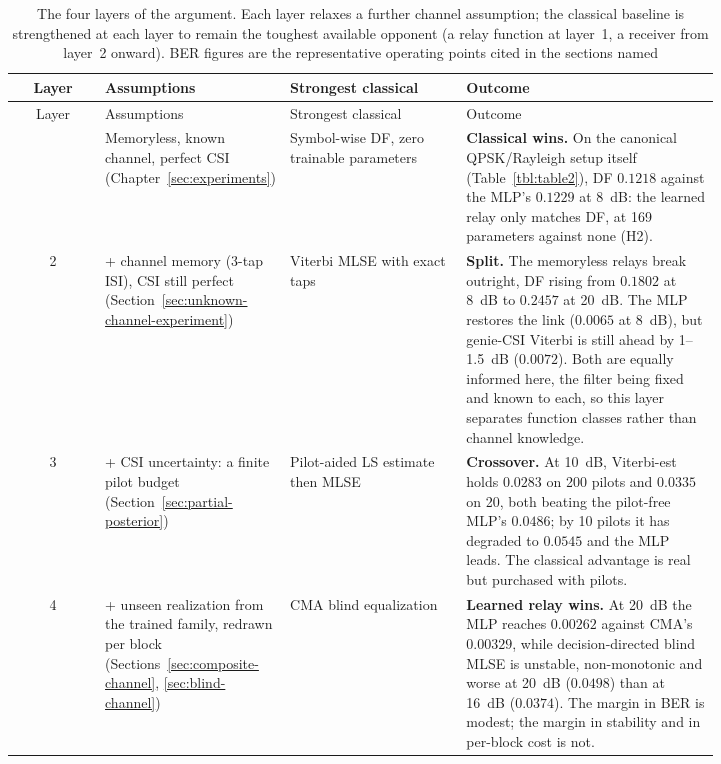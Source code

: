 \begin{longtable}[]{@{}c>{\raggedright\arraybackslash}p{0.21\linewidth}>{\raggedright\arraybackslash}p{0.25\linewidth}>{\raggedright\arraybackslash}p{0.36\linewidth}@{}}
\caption[The four layers of the argument]{The four layers of the argument. Each layer relaxes a further channel assumption; the classical baseline is strengthened at each layer to remain the toughest available opponent (a relay function at layer~1, a receiver from layer~2 onward). BER figures are the representative operating points cited in the sections named}\label{tbl:layers}\tabularnewline
\toprule\noalign{}
Layer & Assumptions & Strongest classical & Outcome \\
\midrule\noalign{}
\endfirsthead
\toprule\noalign{}
Layer & Assumptions & Strongest classical & Outcome \\
\midrule\noalign{}
\endhead
\bottomrule\noalign{}
\endlastfoot
1 & Memoryless, known channel, perfect CSI (Chapter~\ref{sec:experiments}) & Symbol-wise DF, zero trainable parameters & \textbf{Classical wins.} On the canonical QPSK/Rayleigh setup itself (Table~\ref{tbl:table2}), DF $0.1218$ against the MLP's $0.1229$ at 8~dB: the learned relay only matches DF, at 169 parameters against none (H2). \\
2 & \;+ channel memory (3-tap ISI), CSI still perfect (Section~\ref{sec:unknown-channel-experiment}) & Viterbi MLSE with exact taps & \textbf{Split.} The memoryless relays break outright, DF rising from $0.1802$ at 8~dB to $0.2457$ at 20~dB. The MLP restores the link ($0.0065$ at 8~dB), but genie-CSI Viterbi is still ahead by 1--1.5~dB ($0.0072$). Both are equally informed here, the filter being fixed and known to each, so this layer separates function classes rather than channel knowledge. \\
3 & \;+ CSI uncertainty: a finite pilot budget (Section~\ref{sec:partial-posterior}) & Pilot-aided LS estimate then MLSE & \textbf{Crossover.} At 10~dB, Viterbi-est holds $0.0283$ on 200 pilots and $0.0335$ on 20, both beating the pilot-free MLP's $0.0486$; by 10 pilots it has degraded to $0.0545$ and the MLP leads. The classical advantage is real but purchased with pilots. \\
4 & \;+ unseen realization from the trained family, redrawn per block (Sections~\ref{sec:composite-channel}, \ref{sec:blind-channel}) & CMA blind equalization & \textbf{Learned relay wins.} At 20~dB the MLP reaches $0.00262$ against CMA's $0.00329$, while decision-directed blind MLSE is unstable, non-monotonic and worse at 20~dB ($0.0498$) than at 16~dB ($0.0374$). The margin in BER is modest; the margin in stability and in per-block cost is not. \\
\end{longtable}

